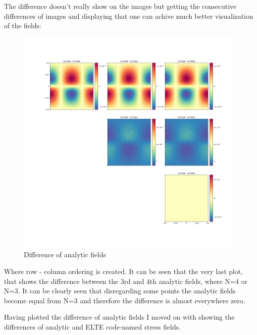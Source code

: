 \documentclass[12pt,a4paper]{article}
\theoremstyle{plain}
\begin{document}
\begin{multicols*}{2}
	\vspace{1cm}

	\par The difference doesn't really show on the images but getting the
	consecutive differences of images and displaying that one can achive
	much better visualization of the fields:

	\begin{figure}[H]
		\centering
		\includegraphics[width=.8\columnwidth]{./difference_of_analytic_fields.png}
		\caption{Difference of analytic fields}
	\end{figure}

	\par Where row - column ordering is created. It can be seen that the very last plot,
	that shows the difference between the 3rd and 4th analytic fields, where N=4 or N=3.
	It can be clearly seen that disregarding some points the analytic fields become equal from N=3
	and therefore the difference is almost everywhere zero.

	\vspace{1cm}

	\par Having plotted the difference of analytic fields I moved on with
	showing the differences of analytic and ELTE code-named stress fields.


\end{multicols*}
\end{document}
